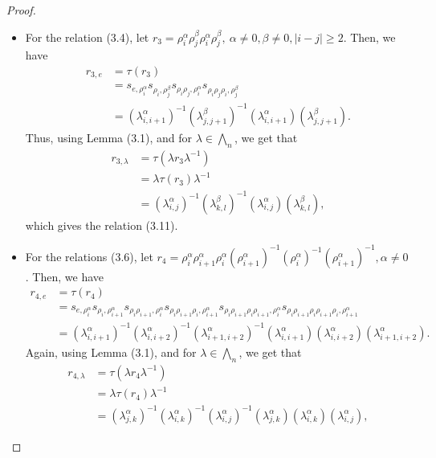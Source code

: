 \documentclass[preprint]{elsarticle}
\begin{document}
\begin{proof}
\begin{itemize}
        \item[iii)] For the relation (3.4), let $r_3=\rho_i^{\alpha} \rho_j^{\beta} \rho_i^{\alpha} \rho_j^{\beta},~ \alpha \neq 0,\beta\neq 0, |i-j| \geq 2$. Then, we have
        \begin{align*}
            r_{3,e} &= \tau(r_3)\\
            &=s_{e,\rho_i^{\alpha}} s_{\rho_i, \rho_j^{\beta}} s_{\rho_i\rho_j,\rho_i^{\alpha}}s_{\rho_i\rho_j\rho_i,\rho_j^{\beta}}\\
            &=(\lambda_{i,i+1}^{\alpha})^{-1} (\lambda_{j,j+1}^{\beta})^{-1} (\lambda_{i,i+1}^{\alpha}) (\lambda_{j,j+1}^{\beta}).
        \end{align*}
        Thus, using Lemma (3.1), and for $\lambda \in \bigwedge_n$, we get that
        \begin{align*}
             r_{3,\lambda} &= \tau(\lambda r_{3} \lambda^{-1})\\ & = \lambda \tau(r_{3}) \lambda^{-1}\\
             &= (\lambda_{i,j}^{\alpha})^{-1} (\lambda_{k,l}^{\beta})^{-1} (\lambda_{i,j}^{\alpha}) (\lambda_{k,l}^{\beta}),
        \end{align*}
        which gives the relation (3.11). 
        \item[iv)] For the relations (3.6), let $r_4=\rho_{i}^{\alpha}\rho_{i+1}^{\alpha}\rho_{i}^{\alpha}(\rho_{i+1}^{\alpha})^{-1} (\rho_{i}^{\alpha})^{-1}(\rho_{i+1}^{\alpha})^{-1},\alpha \neq 0$. Then, we have
        \begin{align*}
            r_{4,e} &= \tau(r_4)\\ &=s_{e,\rho_i^{\alpha}}s_{\rho_i,\rho_{i+1}^{\alpha}}s_{\rho_i\rho_{i+1},\rho_{i}^{\alpha}}s_{\rho_i\rho_{i+1}\rho_i,\rho_{i+1}^{\alpha}}s_{\rho_i\rho_{i+1}\rho_i \rho_{i+1},\rho_{i}^{\alpha}} s_{\rho_i\rho_{i+1}\rho_i \rho_{i+1}\rho_i,\rho_{i+1}^{\alpha}}\\
            &=(\lambda_{i,i+1}^{\alpha})^{-1} (\lambda_{i,i+2}^{\alpha})^{-1} (\lambda_{i+1,i+2}^{\alpha})^{-1} (\lambda_{i,i+1}^{\alpha}) (\lambda_{i,i+2}^{\alpha}) (\lambda_{i+1,i+2}^{\alpha}).
        \end{align*}
        Again, using Lemma (3.1), and for $\lambda \in \bigwedge_n$, we get that
       \begin{align*}
            r_{4,\lambda} &= \tau(\lambda r_{4} \lambda^{-1})\\ &= \lambda \tau(r_{4}) \lambda^{-1}\\
            &= (\lambda_{j,k}^{\alpha})^{-1} (\lambda_{i,k}^{\alpha})^{-1} (\lambda_{i,j}^{\alpha})^{-1} (\lambda_{j,k}^{\alpha})(\lambda_{i,k}^{\alpha})(\lambda_{i,j}^{\alpha}),

\end{align*}
\end{itemize}
\end{proof}
\end{document}
